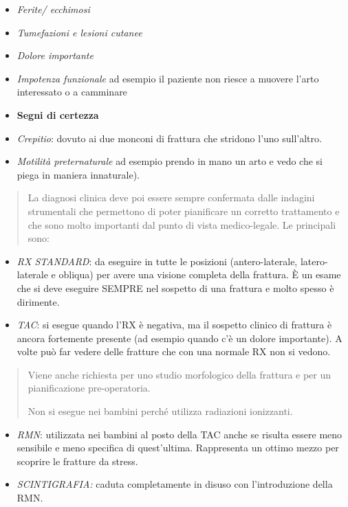 \documentclass[]{article}
\begin{document}
\begin{itemize}
\item
  \emph{Ferite/ ecchimosi}
\item
  \emph{Tumefazioni e lesioni cutanee}
\item
  \emph{Dolore importante}
\item
  \emph{Impotenza funzionale} ad esempio il paziente non riesce a
  muovere l'arto interessato o a camminare
\end{itemize}

\begin{itemize}
\item
  \textbf{Segni di certezza }
\end{itemize}

\begin{itemize}
\item
  \emph{Crepitio}: dovuto ai due monconi di frattura che stridono l'uno
  sull'altro.
\item
  \emph{Motilità preternaturale} ad esempio prendo in mano un arto e
  vedo che si piega in maniera innaturale).
\end{itemize}

\begin{quote}
La diagnosi clinica deve poi essere sempre confermata dalle indagini
strumentali che permettono di poter pianificare un corretto trattamento
e che sono molto importanti dal punto di vista medico-legale. Le
principali sono:
\end{quote}

\begin{itemize}
\item
  \emph{RX STANDARD}: da eseguire in tutte le posizioni
  (antero-laterale, latero-laterale e obliqua) per avere una visione
  completa della frattura. È un esame che si deve eseguire SEMPRE nel
  sospetto di una frattura e molto spesso è dirimente.
\item
  \emph{TAC}: si esegue quando l'RX è negativa, ma il sospetto clinico
  di frattura è ancora fortemente presente (ad esempio quando c'è un
  dolore importante). A volte può far vedere delle fratture che con una
  normale RX non si vedono.
\end{itemize}

\begin{quote}
Viene anche richiesta per uno studio morfologico della frattura e per un
pianificazione pre-operatoria.

Non si esegue nei bambini perché utilizza radiazioni ionizzanti.
\end{quote}

\begin{itemize}
\item
  \emph{RMN}: utilizzata nei bambini al posto della TAC anche se risulta
  essere meno sensibile e meno specifica di quest'ultima. Rappresenta un
  ottimo mezzo per scoprire le fratture da stress.
\item
  \emph{SCINTIGRAFIA:} caduta completamente in disuso con l'introduzione
  della RMN.
\end{itemize}
\end{document}
